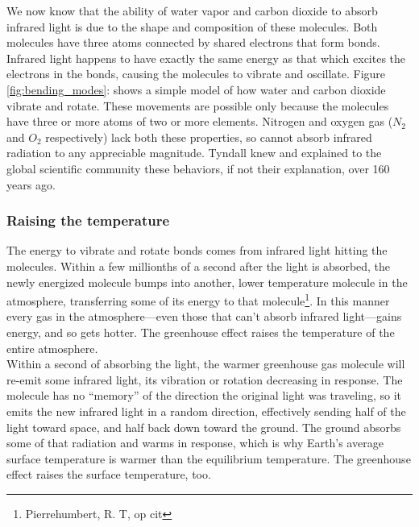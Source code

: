 \documentclass[amstex,12pt]{book}
\begin{document}
We now know that the ability of water vapor and carbon dioxide to absorb infrared light is due to the shape and composition of these molecules. Both molecules have three atoms connected by shared electrons that form bonds. Infrared light happens to have exactly the same energy as that which excites the electrons in the bonds, causing the molecules to vibrate and oscillate. Figure \ref{fig:bending_modes}: shows a simple model of how water and carbon dioxide vibrate and rotate. These movements are possible only because the molecules have three or more atoms of two or more elements. Nitrogen and oxygen gas ($N_2$ and $O_2$ respectively) lack both these properties, so cannot absorb infrared radiation to any appreciable magnitude. Tyndall knew and explained to the global scientific community these behaviors, if not their explanation, over 160 years ago.\\ 
\subsubsection{Raising the temperature}
The energy to vibrate and rotate bonds comes from infrared light hitting the molecules. Within a few millionths of a second after the light is absorbed, the newly energized molecule bumps into another, lower temperature molecule in the atmosphere, transferring some of its energy to that molecule\footnote{Pierrehumbert, R. T, op cit}. In this manner every gas in the atmosphere---even those that can't absorb infrared light---gains energy, and so gets hotter. The greenhouse effect raises the temperature of the entire atmosphere.\\
Within a second of absorbing the light, the warmer greenhouse gas molecule will re-emit some infrared light, its vibration or rotation decreasing in response. The molecule has no ``memory'' of the direction the original light was traveling, so it emits the new infrared light in a random direction, effectively sending half of the light toward space, and half back down toward the ground. The ground absorbs some of that radiation and warms in response, which is why Earth’s average surface temperature is warmer than the equilibrium temperature. The greenhouse effect raises the surface temperature, too.\\
\end{document}
